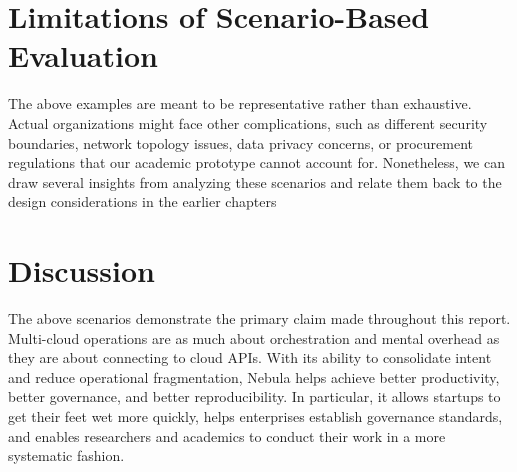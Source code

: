 \section{Limitations of Scenario-Based Evaluation}

The above examples are meant to be representative rather than exhaustive. Actual organizations might face other complications, such as different security boundaries, network topology issues, data privacy concerns, or procurement regulations that our academic prototype cannot account for. Nonetheless, we can draw several insights from analyzing these scenarios and relate them back to the design considerations in the earlier chapters

\section{Discussion}

The above scenarios demonstrate the primary claim made throughout this report. Multi-cloud operations are as much about orchestration and mental overhead as they are about connecting to cloud APIs. With its ability to consolidate intent and reduce operational fragmentation, Nebula helps achieve better productivity, better governance, and better reproducibility. In particular, it allows startups to get their feet wet more quickly, helps enterprises establish governance standards, and enables researchers and academics to conduct their work in a more systematic fashion.

\newpage
